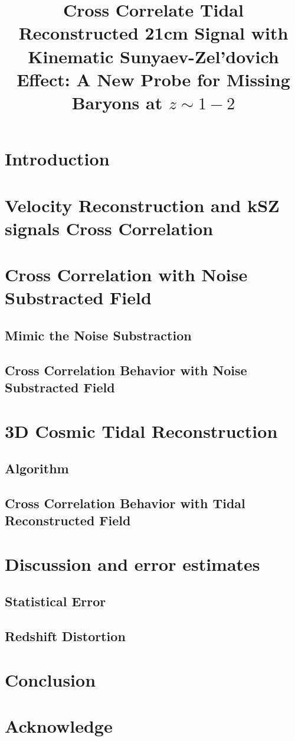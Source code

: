 \documentclass[aps,prd,twocolumn,showpacs,superscriptaddress,groupedaddress,nofootinbib]{revtex4}  %
\begin{document}
\widetext

\title{Cross Correlate Tidal Reconstructed 21cm Signal with Kinematic Sunyaev-Zel'dovich Effect: A New Probe for Missing Baryons at $z\sim1-2$}
%

\pacs{}
\maketitle

\section{Introduction}


\section{Velocity Reconstruction and kSZ signals Cross Correlation}

\section{Cross Correlation with Noise Substracted Field} 
\subsection{Mimic the Noise Substraction}

\subsection{Cross Correlation Behavior with Noise Substracted Field}

\section{3D Cosmic Tidal Reconstruction}
\subsection{Algorithm}

\subsection{Cross Correlation Behavior with Tidal Reconstructed Field}

\section{Discussion and error estimates}
\subsection{Statistical Error}

\subsection{Redshift Distortion}

\section{Conclusion}
\section{Acknowledge}



\end{document}
